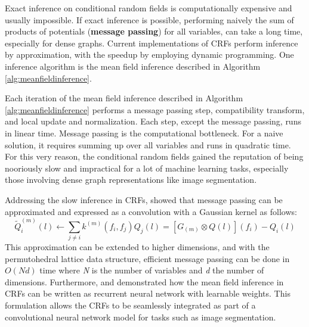 \documentclass[journal]{IEEEtran}
\begin{document}
Exact inference on conditional random fields is computationally expensive and usually impossible. If exact inference is possible, performing naively the sum of products of potentials (\textbf{message passing}) for all variables, can take a long time, especially for dense graphs. Current implementations of CRFs perform inference by approximation, with the speedup by employing dynamic programming. One inference algorithm is the mean field inference described in Algorithm \ref{alg:meanfieldinference}.

Each iteration of the mean field inference described in Algorithm \ref{alg:meanfieldinference} performs a message passing step, compatibility transform, and local update and normalization. Each step, except the message passing, runs in linear time. Message passing is the computational bottleneck. For a naive solution, it requires summing up over all variables and runs in quadratic time. For this very reason, the conditional random fields gained the reputation of being nooriously slow and impractical for a lot of machine learning tasks, especially those involving dense graph representations like image segmentation.

Addressing the slow inference in CRFs, \cite{NIPS2011_4296} showed that message passing can be approximated and expressed as a convolution with a Gaussian kernel as follows:
\begin{equation}
\widetilde{Q}_i^{(m)}(l)\gets \sum_{j\neq i}k^{(m)}(f_i,f_j)Q_j(l) = [G_(m) \otimes Q(l)](f_i) - Q_i(l)
\end{equation}
This approximation can be extended to higher dimensions, and with the permutohedral lattice data structure, efficient message passing can be done in $O(Nd)$ time where \textit{N} is the number of variables and \textit{d} the number of dimensions. 
Furthermore, \cite{crfasrnn_ICCV2015} and \cite{higherordercrf_ECCV2016} demonstrated how the mean field inference in CRFs can be written as recurrent neural network with learnable weights. This formulation allows the CRFs to be seamlessly integrated as part of a convolutional neural network model for tasks such as image segmentation.
\end{document}
